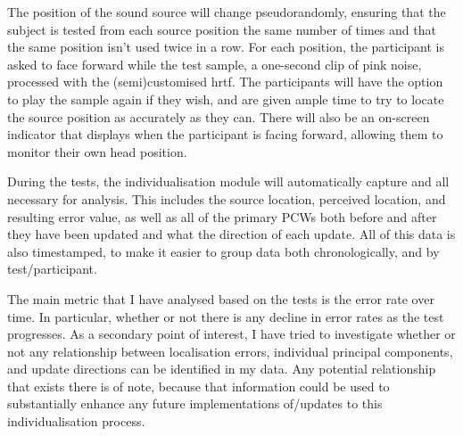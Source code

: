 The position of the sound source will change pseudorandomly, ensuring that the subject is tested from each source position the same number of times and that the same position isn't used twice in a row. For each position, the participant is asked to face forward while the test sample, a one-second clip of pink noise, processed with the (semi)customised hrtf. The participants will have the option to play the sample again if they wish, and are given ample time to try to locate the source position as accurately as they can. There will also be an on-screen indicator that displays when the participant is facing forward, allowing them to monitor their own head position.

During the tests, the individualisation module will automatically capture and all necessary for analysis. This includes the source location, perceived location, and resulting error value, as well as all of the primary PCWs both before and after they have been updated and what the direction of each update. All of this data is also timestamped, to make it easier to group data both chronologically, and by test/participant. 

The main metric that I have analysed based on the tests is the error rate over time. In particular, whether or not there is any decline in error rates as the test progresses. As a secondary point of interest, I have tried to investigate whether or not any relationship between localisation errors, individual principal components, and update directions can be identified in my data. Any potential relationship that exists there is of note, because that information could be used to substantially enhance any future implementations of/updates to this individualisation process.